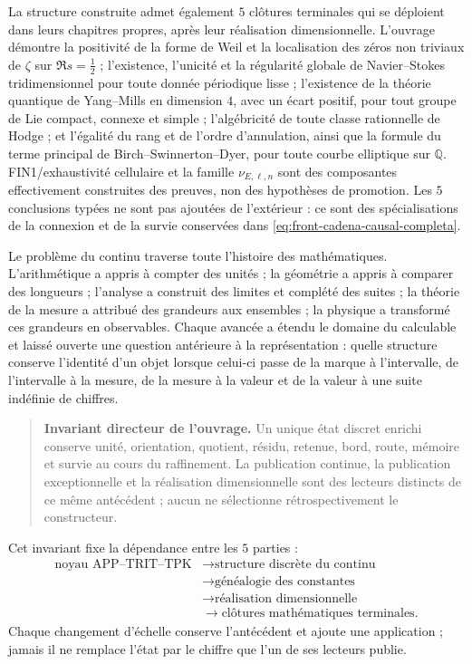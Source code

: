 La structure construite admet également \(5\) clôtures terminales qui se
déploient dans leurs chapitres propres, après leur réalisation dimensionnelle.
L'ouvrage démontre la positivité de la forme de Weil et la localisation des
zéros non triviaux de \(\zeta\) sur \(\Re s=\tfrac12\) ; l'existence,
l'unicité et la régularité globale de Navier--Stokes tridimensionnel pour toute donnée
périodique lisse ; l'existence de la théorie quantique de Yang--Mills en
dimension \(4\), avec un écart positif, pour tout groupe de Lie compact,
connexe et simple ; l'algébricité de toute classe rationnelle de Hodge ; et
l'égalité du rang et de l'ordre d'annulation, ainsi que la formule du terme
principal de Birch--Swinnerton--Dyer, pour toute courbe elliptique sur
\(\mathbb Q\). FIN1/exhaustivité cellulaire et la famille
\(\nu_{E,\ell,n}\) sont des composantes effectivement construites des preuves,
non des hypothèses de promotion. Les \(5\) conclusions typées ne sont pas ajoutées
de l'extérieur : ce sont des spécialisations de la connexion et de la survie
conservées dans \eqref{eq:front-cadena-causal-completa}.

Le problème du continu traverse toute l'histoire des mathématiques.
L'arithmétique a appris à compter des unités ; la géométrie a appris à comparer
des longueurs ; l'analyse a construit des limites et complété des suites ; la théorie de
la mesure a attribué des grandeurs aux ensembles ; la physique a transformé ces grandeurs
en observables. Chaque avancée a étendu le domaine du calculable et laissé ouverte
une question antérieure à la représentation : quelle structure conserve
l'identité d'un objet lorsque celui-ci passe de la marque à l'intervalle, de
l'intervalle à la mesure, de la mesure à la valeur et de la valeur à une suite
indéfinie de chiffres.

\begin{quote}
\textbf{Invariant directeur de l'ouvrage.}
Un unique état discret enrichi conserve unité, orientation, quotient,
résidu, retenue, bord, route, mémoire et survie au cours du
raffinement. La publication continue, la publication exceptionnelle et la
réalisation dimensionnelle sont des lecteurs distincts de ce même antécédent ;
aucun ne sélectionne rétrospectivement le constructeur.
\end{quote}

Cet invariant fixe la dépendance entre les \(5\) parties :
\[
\begin{aligned}
\text{noyau APP--TRIT--TPK}
&\longrightarrow \text{structure discrète du continu}\\
&\longrightarrow \text{généalogie des constantes}\\
&\longrightarrow \text{réalisation dimensionnelle}\\
&\longrightarrow \text{clôtures mathématiques terminales}.
\end{aligned}
\]
Chaque changement d'échelle conserve l'antécédent et ajoute une application ; jamais
il ne remplace l'état par le chiffre que l'un de ses lecteurs publie.

